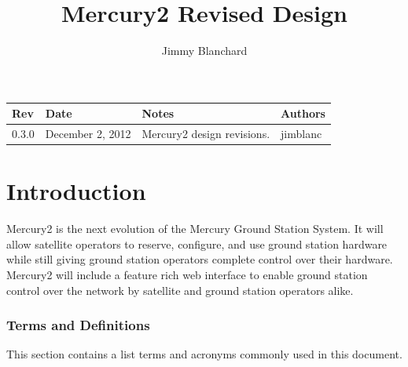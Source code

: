 \documentclass{mxl-design}
\title{Mercury2 Revised Design}
\author{Jimmy Blanchard}
\begin{document}
\maketitle

\vspace{5in}
\begin{table}[H]
\begin{center}
\begin{tabular}{|p{0.5in}|p{1.2in}|p{2.8in}|p{0.5in}|}
	\hline
	\bf Rev & \bf Date & \bf Notes & \bf Authors \\ 
	\hline
	0.3.0 & December 2, 2012 & Mercury2 design revisions. & jimblanc \\ \hline
\end{tabular}
\end{center}
\end{table}

\clearpage
\tableofcontents
\clearpage

\part{Introduction}
Mercury2 is the next evolution of the Mercury Ground Station System. It will allow satellite operators to reserve, configure, and use ground station hardware while still giving ground station operators complete control over their hardware. Mercury2 will include a feature rich web interface to enable ground station control over the network by satellite and ground station operators alike.

\section{Terms and Definitions}
This section contains a list terms and acronyms commonly used in this document.
\end{document}
